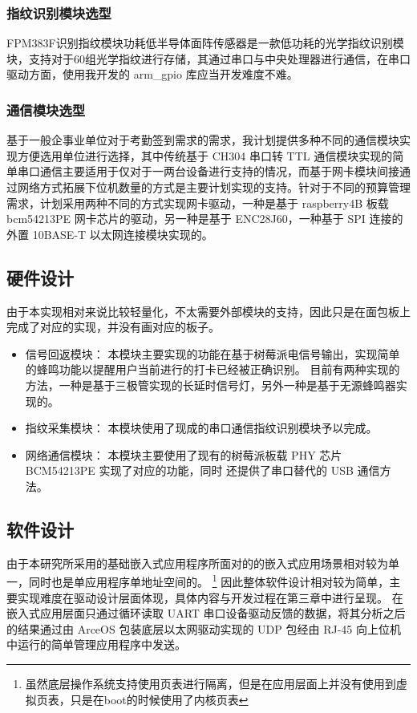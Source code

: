 \subsubsection{指纹识别模块选型}

FPM383F识别指纹模块功耗低半导体面阵传感器是一款低功耗的光学指纹识别模块，支持对于60组光学指纹进行存储，其通过串口与中央处理器进行通信，在串口驱动方面，使用我开发的 arm\_gpio 库应当开发难度不难。

\subsubsection{通信模块选型}

基于一般企事业单位对于考勤签到需求的需求，我计划提供多种不同的通信模块实现方便选用单位进行选择，其中传统基于 CH304 串口转 TTL 通信模块实现的简单串口通信主要适用于仅对于一两台设备进行支持的情况，而基于网卡模块间接通过网络方式拓展下位机数量的方式是主要计划实现的支持。针对于不同的预算管理需求，计划采用两种不同的方式实现网卡驱动，一种是基于 raspberry4B 板载 bcm54213PE 网卡芯片的驱动，另一种是基于 ENC28J60，一种基于 SPI 连接的外置 10BASE-T 以太网连接模块实现的。

\subsection{硬件设计}

    由于本实现相对来说比较轻量化，不太需要外部模块的支持，因此只是在面包板上完成了对应的实现，并没有画对应的板子。

    \begin{itemize}
        \item 信号回返模块：
            本模块主要实现的功能在基于树莓派电信号输出，实现简单的蜂鸣功能以提醒用户当前进行的打卡已经被正确识别。
            目前有两种实现的方法，一种是基于三极管实现的长延时信号灯，另外一种是基于无源蜂鸣器实现的。
        \item 指纹采集模块：
            本模块使用了现成的串口通信指纹识别模块予以完成。
        \item 网络通信模块：
            本模块主要使用了现有的树莓派板载 PHY 芯片 BCM54213PE 实现了对应的功能，同时
            还提供了串口替代的 USB 通信方法。
    \end{itemize}

\subsection{软件设计}

    由于本研究所采用的基础嵌入式应用程序所面对的的嵌入式应用场景相对较为单一，同时也是单应用程序单地址空间的。
    \footnote{虽然底层操作系统支持使用页表进行隔离，但是在应用层面上并没有使用到虚拟页表，只是在boot的时候使用了内核页表}
    因此整体软件设计相对较为简单，主要实现难度在驱动设计层面体现，具体内容与开发过程在第三章中进行呈现。
    在嵌入式应用层面只通过循环读取 UART 串口设备驱动反馈的数据，将其分析之后的结果通过由 ArceOS 包装底层以太网驱动实现的
    UDP 包经由 RJ-45 向上位机中运行的简单管理应用程序中发送。

